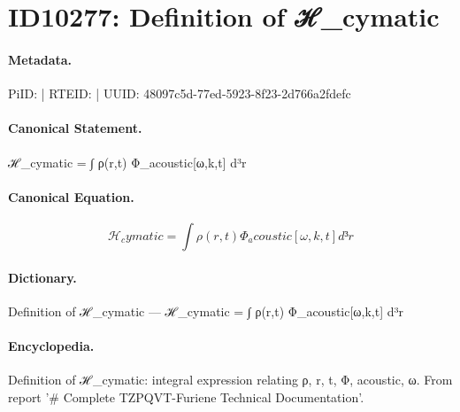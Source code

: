 \section*{ID10277: Definition of ℋ\_cymatic}
\paragraph{Metadata.}
PiID:  | RTEID:  | UUID: 48097c5d-77ed-5923-8f23-2d766a2fdefc

\paragraph{Canonical Statement.}
ℋ\_cymatic = ∫ ρ(r,t) Φ\_acoustic[ω,k,t] d³r

\paragraph{Canonical Equation.}
\[
ℋ_cymatic = ∫ ρ(r,t) Φ_acoustic[ω,k,t] d³r
\]

\paragraph{Dictionary.}
Definition of ℋ\_cymatic — ℋ\_cymatic = ∫ ρ(r,t) Φ\_acoustic[ω,k,t] d³r

\paragraph{Encyclopedia.}
Definition of ℋ\_cymatic: integral expression relating ρ, r, t, Φ, acoustic, ω. From report '\# Complete TZPQVT-Furiene Technical Documentation'.
